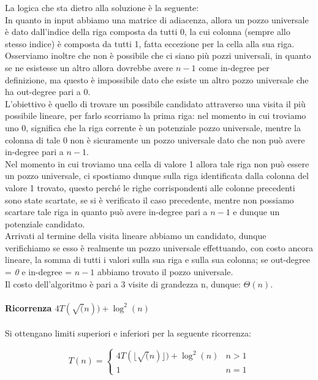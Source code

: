 \documentclass[../cheatSheetAlgoritmi.tex]{subfiles}
\begin{document}
La logica che sta dietro alla soluzione è la seguente: \\
In quanto in input abbiamo una matrice di adiacenza, allora un pozzo universale è dato dall'indice della riga composta da tutti 0, la cui colonna (sempre allo stesso indice) è composta da tutti 1, fatta eccezione per la cella alla sua riga. \\ Osserviamo inoltre che non è possibile che ci siano più pozzi universali, in quanto se ne esistesse un altro allora dovrebbe avere $n-1$ come in-degree per definizione, ma questo è impossibile dato che esiste un altro pozzo universale che ha out-degree pari a 0.\\
 L'obiettivo è quello di trovare un possibile candidato attraverso una visita il più possibile lineare, per farlo scorriamo la prima riga: nel momento in cui troviamo uno 0, significa che la riga corrente è un potenziale pozzo universale, mentre la colonna di tale 0 non è sicuramente un pozzo universale dato che non può avere in-degree pari a $n-1$. \\
Nel momento in cui troviamo una cella di valore 1 allora tale riga non può essere un pozzo universale, ci spostiamo dunque sulla riga identificata dalla colonna del valore 1 trovato, questo perché le righe corrispondenti alle colonne precedenti sono state scartate, se si è verificato il caso precedente, mentre non possiamo scartare tale riga in quanto può avere in-degree pari a $n-1$ e dunque un potenziale candidato.\\
Arrivati al termine della visita lineare abbiamo un candidato, dunque verifichiamo se esso è realmente un pozzo universale effettuando, con costo ancora lineare, la somma di tutti i valori sulla sua riga e sulla sua colonna; se out-degree = \textit{0} e in-degree = $n - 1$ abbiamo trovato il pozzo universale.\\
Il costo dell'algoritmo è pari a 3 visite di grandezza n, dunque: $\Theta(n)$.
\\\\
\textbf{Ricorrenza $4T(\sqrt(n)) + \log^2(n)$}\\\\
Si ottengano limiti superiori e inferiori per la seguente ricorrenza:
\begin{center}
	\begin{equation*}
  		T(n)=\begin{cases}
    		4T(\lfloor \sqrt(n) \rfloor) + \log^2(n)  & \text{$n > 1$}\\
    		1 & \text{$n = 1$}
  		\end{cases}
	\end{equation*}
\end{center}
\end{document}
